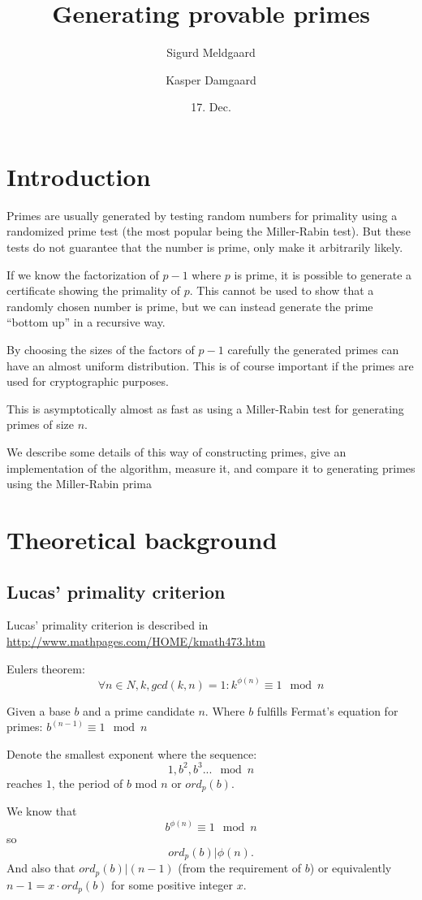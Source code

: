 \documentclass[11pt,a4paper]{article}
\title{Generating provable primes}
\author{Sigurd Meldgaard \and Kasper Damgaard}
\date{17. Dec.}
\begin{document}
\maketitle
\section{Introduction}
Primes are usually generated by testing random numbers for primality
using a randomized prime test (the most popular being the Miller-Rabin
test).  But these tests do not guarantee that the number is prime,
only make it arbitrarily likely.

If we know the factorization of $p-1$ where $p$ is prime, it is
possible to generate a certificate showing the primality of $p$. This
cannot be used to show that a randomly chosen number is prime, but we
can instead generate the prime ``bottom up'' in a recursive way.

By choosing the sizes of the factors of $p-1$ carefully the generated
primes can have an almost uniform distribution. This is of course
important if the primes are used for cryptographic purposes.

This is asymptotically almost as fast as using a Miller-Rabin test for
generating primes of size $n$.

We describe some details of this way of constructing primes, give an
implementation of the algorithm, measure it, and compare it to
generating primes using the Miller-Rabin prima
\section{Theoretical background}
\subsection{Lucas' primality criterion}
Lucas' primality criterion is described in \url{http://www.mathpages.com/HOME/kmath473.htm}

Eulers theorem:
\[
\forall n\in N, k, gcd(k,n)=1: k^{\phi(n)} \equiv 1 \mod n
\]

Given a base $b$ and a prime candidate $n$. Where $b$ fulfills Fermat's equation for primes:
$b^{(n-1)}  \equiv  1    \mod n$

Denote the smallest exponent where the sequence:
\[1, b^2, b^3 ... \mod n\]
reaches $1$, the period of $b$ mod $n$ or $ord_p(b)$. 

We know that 
\[b^{\phi(n)} \equiv 1 \mod n\]
 so 
\[ord_p(b)|\phi(n).\] 
And also that \mbox{$ord_p(b)|(n-1)$} (from the requirement of $b$) or
equivalently $n-1 = x\cdot ord_p(b)$ for some positive integer $x$.
\end{document}
